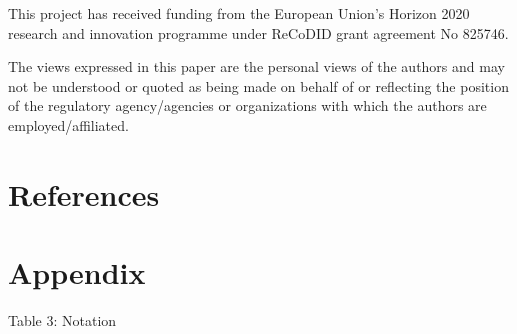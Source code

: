 \documentclass[
]{jss}
\begin{document}
This project has received funding from the European Union's Horizon 2020
research and innovation programme under ReCoDID grant agreement No
825746.

The views expressed in this paper are the personal views of the authors
and may not be understood or quoted as being made on behalf of or
reflecting the position of the regulatory agency/agencies or
organizations with which the authors are employed/affiliated.

\hypertarget{references}{%
\section{References}\label{references}}

\hypertarget{appendix}{%
\section{Appendix}\label{appendix}}

Table 3: Notation
\end{document}
